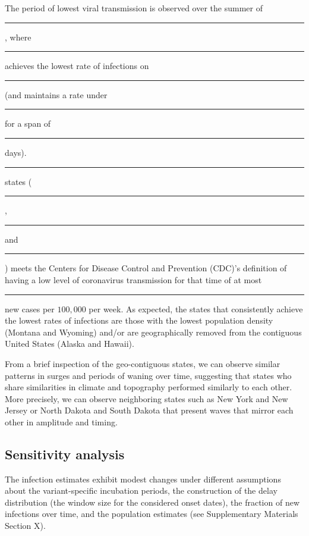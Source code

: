 \documentclass{article}
\newcommand{\attn }[1]{\textcolor{red}{ATTN: #1}}
\begin{document}
The period of lowest viral transmission is observed over the summer of \rule{1cm}{0.15mm},
where \rule{1cm}{0.15mm} achieves the lowest rate of infections on \rule{1cm}{0.15mm} (and
maintains a rate under \rule{1cm}{0.15mm} for a span of \rule{1cm}{0.15mm} days).
\rule{1cm}{0.15mm} states (\rule{1cm}{0.15mm}, \rule{1cm}{0.15mm} and \rule{1cm}{0.15mm})
meets the Centers for Disease Control and Prevention (CDC)’s definition of having a low
level of coronavirus transmission for that time of at most \rule{1cm}{0.15mm} new cases
per $100,000$ per week. As expected, the states that consistently achieve the lowest rates
of infections are those with the lowest population density (Montana and Wyoming) and/or
are geographically removed from the contiguous United States (Alaska and Hawaii). %

From a brief inspection of the geo-contiguous states, we can observe similar patterns in
surges and periods of waning over time, suggesting that states who share similarities in
climate and topography performed similarly to each other. More precisely, we can observe
neighboring states such as New York and New Jersey or North Dakota and South Dakota that
present waves that mirror each other in amplitude and timing.

\subsection{Sensitivity analysis}
The infection estimates exhibit modest changes under different assumptions about the
variant-specific incubation periods, the construction of the delay distribution (the
window size for the considered onset dates), the fraction of new infections over time, and
the population estimates (see Supplementary Materials Section X). 

\end{document}
